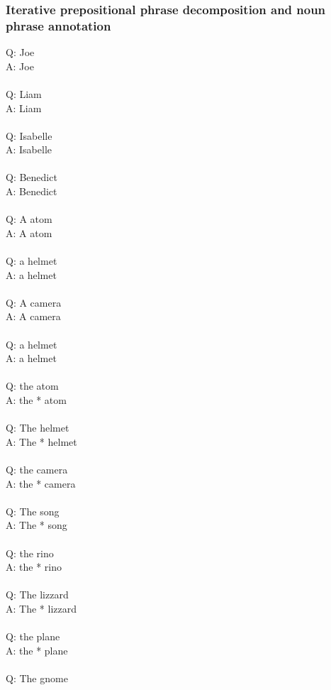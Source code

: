 \documentclass{article} \usepackage{iclr2022_conference,times}
\newcommand{\prompt}[1]{{\footnotesize \textsf{#1}}}
\begin{document}
\subsubsection{Iterative prepositional phrase decomposition and noun phrase annotation}
\prompt{Q: Joe \\
A: Joe \\
 \\
Q: Liam \\
A: Liam \\
 \\
Q: Isabelle \\
A: Isabelle \\
 \\
Q: Benedict \\
A: Benedict \\
 \\
Q: A atom \\
A: A atom \\
 \\
Q: a helmet \\
A: a helmet \\
 \\
Q: A camera \\
A: A camera \\
 \\
Q: a helmet \\
A: a helmet \\
 \\
Q: the atom \\
A: the * atom \\
 \\
Q: The helmet \\
A: The * helmet \\
 \\
Q: the camera \\
A: the * camera \\
 \\
Q: The song \\
A: The * song \\
 \\
Q: the rino \\
A: the * rino \\
 \\
Q: The lizzard \\
A: The * lizzard \\
 \\
Q: the plane \\
A: the * plane \\
 \\
Q: The gnome \\
}
\end{document}

